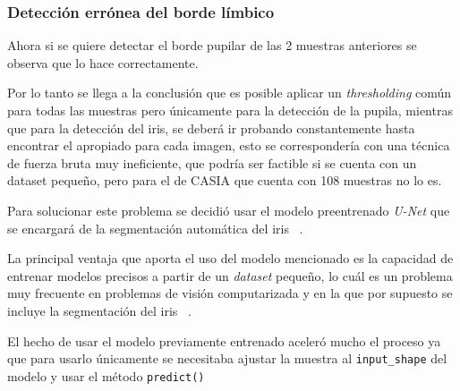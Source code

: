 \subsubsection{Detección errónea del borde límbico}

Ahora si se quiere detectar el borde pupilar de las 2 muestras anteriores se observa que lo hace correctamente.



Por lo tanto se llega a la conclusión que es posible aplicar un \emph{thresholding} común para todas las muestras pero únicamente para la detección de la pupila, mientras que para la detección del iris, se deberá ir probando constantemente hasta encontrar el apropiado para cada imagen, esto se correspondería con una técnica de fuerza bruta muy ineficiente, que podría ser factible si se cuenta con un dataset pequeño, pero para el de CASIA que cuenta con 108 muestras no lo es.

Para solucionar este problema se decidió usar el modelo  preentrenado \emph{U-Net} que se encargará de la segmentación automática del iris ~\cite{ronnenberger:2015, lozej:2018}.


La principal ventaja que aporta el uso del modelo mencionado es la capacidad de entrenar modelos precisos a partir de un \emph{dataset} pequeño, lo cuál es un problema muy frecuente en problemas de visión computarizada y en la que por supuesto se incluye la segmentación del iris ~\cite{waisy:2017}.

El hecho de usar el modelo previamente entrenado aceleró mucho el proceso ya que para usarlo únicamente se necesitaba ajustar la muestra al \texttt{input\_shape} del modelo y usar el método \texttt{predict()} ~\cite{jus390:2019} 


